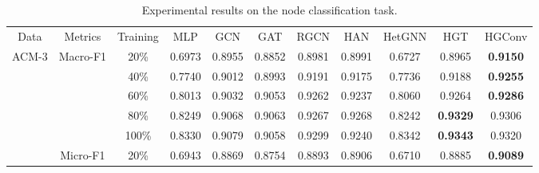 \begin{table*}[t]
\centering
\caption{Experimental results on the node classification task.}
\label{tab:classification_results}
\begin{tabular}{|c|c|c|c|c|c|c|c|c|c|c|}
\hline
\multirow{2}{*}{Data}   & \multirow{2}{*}{Metrics}  & \multirow{2}{*}{Training} & \multirow{2}{*}{MLP} & \multirow{2}{*}{GCN} & \multirow{2}{*}{GAT} & \multirow{2}{*}{RGCN} & \multirow{2}{*}{HAN} & \multirow{2}{*}{HetGNN} & \multirow{2}{*}{HGT} & \multirow{2}{*}{HGConv} \\
                        &                           &                             &                      &                      &                      &                       &                      &                         &                      &                       \\ \hline
\multirow{10}{*}{ACM-3} & \multirow{5}{*}{Macro-F1} & 20\%                        & 0.6973               & 0.8955               & 0.8852               & 0.8981                & 0.8991               & 0.6727                  & 0.8965               & \textbf{0.9150}       \\  
                        &                           & 40\%                        & 0.7740               & 0.9012               & 0.8993               & 0.9191                & 0.9175               & 0.7736                  & 0.9188               & \textbf{0.9255}       \\  
                        &                           & 60\%                        & 0.8013               & 0.9032               & 0.9053               & 0.9262                & 0.9237               & 0.8060                  & 0.9264               & \textbf{0.9286}       \\  
                        &                           & 80\%                        & 0.8249               & 0.9068               & 0.9063               & 0.9267                & 0.9268               & 0.8242                  & \textbf{0.9329}      & 0.9306                \\  
                        &                           & 100\%                       & 0.8330               & 0.9079               & 0.9058               & 0.9299                & 0.9240               & 0.8342                  & \textbf{0.9343}      & 0.9320                \\ \cline{2-11} 
                        & \multirow{5}{*}{Micro-F1} & 20\%                        & 0.6943               & 0.8869               & 0.8754               & 0.8893                & 0.8906               & 0.6710                  & 0.8885               & \textbf{0.9089}       \\  

\end{tabular}
\end{table*}
